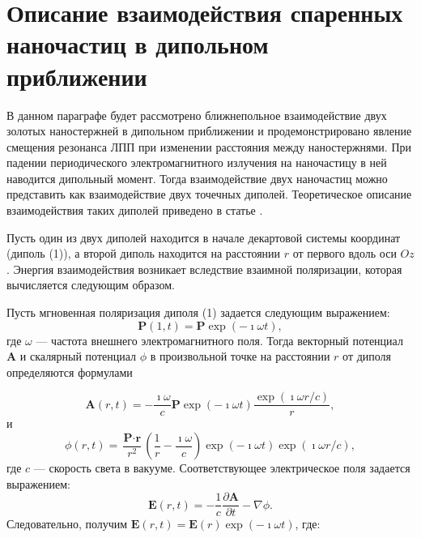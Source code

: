 \section{Описание взаимодействия спаренных наночастиц в дипольном приближении}

В данном параграфе будет рассмотрено ближнепольное взаимодействие двух золотых наностержней в дипольном приближении и продемонстрировано явление смещения резонанса ЛПП при изменении расстояния между наностержнями.
При падении периодического электромагнитного излучения на наночастицу в ней наводится дипольный момент. Тогда взаимодействие двух наночастиц можно представить как взаимодействие двух точечных диполей. Теоретическое описание взаимодействия таких диполей приведено в статье \cite{dipoleInteraction}.

Пусть один из двух диполей находится в начале декартовой системы координат (диполь (1)), а второй диполь находится на расстоянии $ r $ от первого вдоль оси $ Oz $. Энергия взаимодействия возникает вследствие взаимной поляризации, которая вычисляется следующим образом.

Пусть мгновенная поляризация диполя (1) задается следующим выражением:
\begin{equation}
\textbf{P} (1, t) = \textbf{P} \exp (-\imath \omega t),
\label{eq:instdipole1}
\end{equation}
где $ \omega $ --- частота внешнего электромагнитного поля.
Тогда векторный потенциал $ \textbf{A} $ и скалярный потенциал $ \phi $ в произвольной точке на расстоянии $ r $ от диполя определяются формулами

\begin{equation}
\textbf{A}(r, t) = - \frac{\imath \omega}{c} \textbf{P} \exp (-\imath \omega t) \frac{\exp (\imath \omega r / c)}{r},
\label{eq:vectorpotential}
\end{equation}
и
\begin{equation}
\phi(r, t) = \frac{\textbf{P} \cdot \textbf{r}}{r^2} \left( \frac{1}{r} - \frac{\imath \omega}{c} \right) \exp (-\imath \omega t) \exp (\imath \omega r / c),
\label{eq:scalarpotential}
\end{equation}
где $ c $ --- скорость света в вакууме. Соответствующее электрическое поля задается выражением:
\begin{equation}
\textbf{E} (r, t) = - \frac{1}{c} \dfrac{\partial \textbf{A}}{\partial t} - \nabla \phi.
\label{eq:elecdipolefromvector}
\end{equation}
Следовательно, получим $ \textbf{E}(r, t) = \textbf{E} (r) \exp(- \imath \omega t) $, где:


